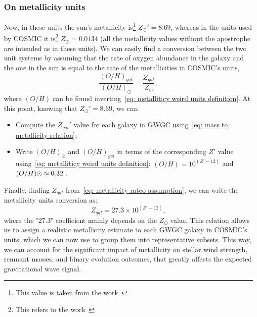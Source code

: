 \subsubsection{On metallicity units}\label{sec:on_metallicity_units} %
Now, in these units the sun's metallicity is\footnote{This value is taken from the work~\cite{AllendePrieto}} $Z_\odot ' = 8.69$, whereas in the units used by COSMIC it is\footnote{This refers to the work~\cite{Asplund}} $Z_\odot=0.0134$ (all the metallicity values without the apostrophe are intended as in these units).
We can easily find a conversion between the two unit systems by assuming that the rate of oxygen abundance in the galaxy and the one in the sun is equal to the rate of the metallicities in COSMIC's units,
\begin{equation}
    \frac{(O/H)_{gal}}{(O/H)_\odot}=\frac{Z_{gal}}{Z_\odot},
    \label{eq: metallicity rateo assumption}
\end{equation}
where $(O/H)$ can be found inverting~\eqref{eq: metalliticy weird units definition}. 
At this point, knowing that $Z_\odot ' = 8.69$, we can:
\begin{itemize}
    \item Compute the $Z_{gal}'$ value for each galaxy in GWGC using~\eqref{eq: mass to metallicity relation};
    \item Write $(O/H)_\odot$ and $(O/H)_{gal}$ in terms of the corresponding $Z'$ value using~\eqref{eq: metalliticy weird units definition}: $(O/H)=10^{(Z'-12)}$ and  $(O/H)\odot \approx 0.32\hspace{1mm}$. 
\end{itemize}
Finally, finding $Z_{gal}$ from~\eqref{eq: metallicity rateo assumption}, we can write the metallicity units conversion as:
\begin{equation}
    Z_{gal}=27.3\times10^{(Z'-12)},
    \label{eq: Metallicity unit conversion}
\end{equation}
where the "$27.3$" coefficient mainly depends on the $Z_\odot$ value.
This relation allows us to assign a realistic metallicity estimate to each GWGC galaxy in COSMIC's units, which we can now use to group them into representative subsets. 
This way, we can account for the significant impact of metallicity on stellar wind strength, remnant masses, and binary evolution outcomes, that greatly affects the expected gravitational wave signal.


